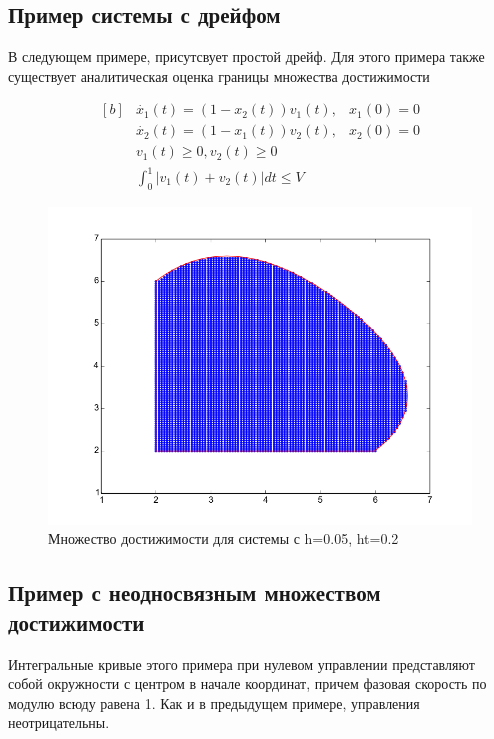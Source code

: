 \pagebreak
\subsection{Пример системы с дрейфом}
\label{sec:swd}

В следующем примере, присутсвует простой дрейф. Для этого примера
также существует аналитическая оценка границы множества достижимости
\cite{AVS2016}

\begin{equation*}
  \begin{aligned}[b]
    &\dot{x_1}(t) = (1 -x_2(t))v_1(t), & x_1(0)=0\\
    &\dot{x_2}(t) = (1-x_1(t))v_2(t), & x_2(0) = 0\\[8pt]
    &v_1(t) \ge 0, v_2(t) \ge 0 \\
    &\int_{0}^{1} |v_1(t) + v_2(t)| dt \le V
  \end{aligned}
\end{equation*}

\begin{figure}[h]
  \centering
  \noindent \hfil
  \includegraphics[width=0.8\linewidth]{img/figure_dc_h_005_ht_02}
  \hfil \caption{Множество достижимости для системы с h=0.05, ht=0.2}
  \label{fig:h001_01}
\end{figure}


\subsection{Пример с неодносвязным множеством достижимости}
\label{sec:swdnrs}


Интегральные кривые этого примера при нулевом управлении
представляют собой окружности с центром в начале координат, причем
фазовая скорость по модулю всюду равена 1. Как и в предыдущем примере,
управления неотрицательны.

